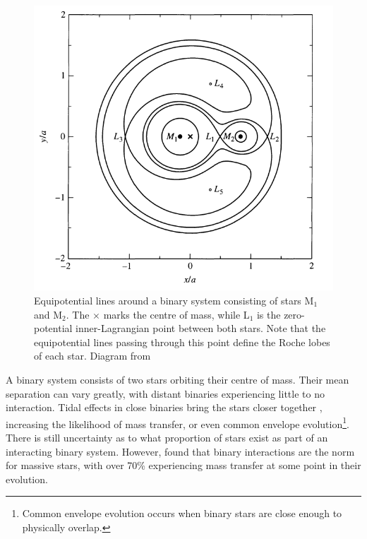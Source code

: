 \begin{figure}
    \centering
    \includegraphics[width=\columnwidth]{figures/intro/RL.png}
    \captionsetup{width=0.9\columnwidth}
    \caption{Equipotential lines around a binary system consisting of stars M$_1$ and M$_2$. The $\times$ marks the centre of mass, while L$_1$ is the zero-potential inner-Lagrangian point between both stars. Note that the equipotential lines passing through this point define the Roche lobes of each star.
    Diagram from \cite{Carroll2007}}
    \label{fig:RocheLobes}
\end{figure}

A binary system consists of two stars orbiting their centre of mass.
Their mean separation can vary greatly, with distant binaries experiencing little to no interaction.
Tidal effects in close binaries bring the stars closer together \citep[see][]{Iliadis2015}, increasing the likelihood of mass transfer, or even common envelope evolution\footnote{Common envelope evolution occurs when binary stars are close enough to physically overlap.}.
There is still uncertainty as to what proportion of stars exist as part of an interacting binary system.
However, \cite{2012Sci...337..444S} found that binary interactions are the norm for massive stars, with over 70\% experiencing mass transfer at some point in their evolution.

